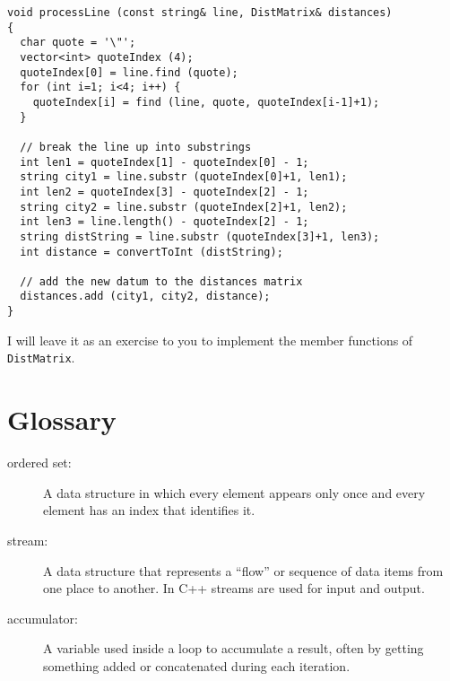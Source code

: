 \begin{verbatim}
void processLine (const string& line, DistMatrix& distances)
{
  char quote = '\"';
  vector<int> quoteIndex (4);
  quoteIndex[0] = line.find (quote);
  for (int i=1; i<4; i++) {
    quoteIndex[i] = find (line, quote, quoteIndex[i-1]+1);
  }

  // break the line up into substrings
  int len1 = quoteIndex[1] - quoteIndex[0] - 1;
  string city1 = line.substr (quoteIndex[0]+1, len1);
  int len2 = quoteIndex[3] - quoteIndex[2] - 1;
  string city2 = line.substr (quoteIndex[2]+1, len2);
  int len3 = line.length() - quoteIndex[2] - 1;
  string distString = line.substr (quoteIndex[3]+1, len3);
  int distance = convertToInt (distString);

  // add the new datum to the distances matrix
  distances.add (city1, city2, distance);
}
\end{verbatim}
%
I will leave it as an exercise to you to implement the
member functions of {\tt DistMatrix}.


\section{Glossary}

\begin{description}

\item[ordered set:]  A data structure in which every element appears
only once and every element has an index that identifies it.

\item[stream:]  A data structure that represents a ``flow'' or
sequence of data items from one place to another.  In C++ streams
are used for input and output.

\item[accumulator:]  A variable used inside a loop to accumulate
a result, often by getting something added or concatenated during each
iteration.


\end{description}


